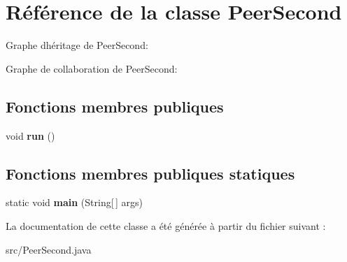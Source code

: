 \hypertarget{classPeerSecond}{}\section{Référence de la classe Peer\+Second}
\label{classPeerSecond}


Graphe d\textquotesingle{}héritage de Peer\+Second\+:


Graphe de collaboration de Peer\+Second\+:
\subsection*{Fonctions membres publiques}
\begin{DoxyCompactItemize}
\item 
\mbox{\label{classPeerSecond_a725f002f7e4ebb2945757f8bf9243cd3}} 
void {\bfseries run} ()
\end{DoxyCompactItemize}
\subsection*{Fonctions membres publiques statiques}
\begin{DoxyCompactItemize}
\item 
\mbox{\label{classPeerSecond_af71fafda6ee3577bf960539e5c7ac86b}} 
static void {\bfseries main} (String\mbox{[}$\,$\mbox{]} args)
\end{DoxyCompactItemize}


La documentation de cette classe a été générée à partir du fichier suivant \+:\begin{DoxyCompactItemize}
\item 
src/Peer\+Second.\+java\end{DoxyCompactItemize}

